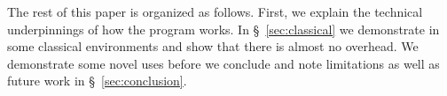 The rest of this paper is organized as follows.  First, we explain the
technical underpinnings of how the program works.  In
\S~\ref{sec:classical} we demonstrate
\freeprocessing{} in some classical environments and show that there
is almost no overhead.  We demonstrate some novel uses
before we conclude and note limitations as well as future work in
\S~\ref{sec:conclusion}.

%




